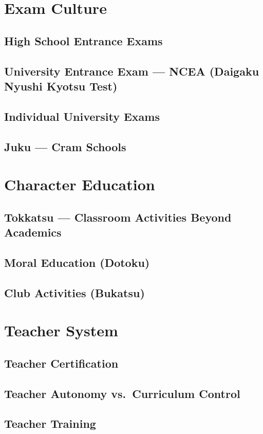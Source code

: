 \section{Exam Culture}
\subsection{High School Entrance Exams}
\subsection{University Entrance Exam --- NCEA (Daigaku Nyushi Kyotsu Test)}
\subsection{Individual University Exams}
\subsection{Juku --- Cram Schools}

\section{Character Education}
\subsection{Tokkatsu --- Classroom Activities Beyond Academics}
\subsection{Moral Education (Dotoku)}
\subsection{Club Activities (Bukatsu)}

\section{Teacher System}
\subsection{Teacher Certification}
\subsection{Teacher Autonomy vs.\ Curriculum Control}
\subsection{Teacher Training}

